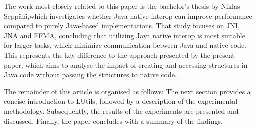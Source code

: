 The work most closely related to this paper is the bachelor’s thesis by Niklas Seppälä\cite{b9},which investigates whether
Java native interop can improve performance compared to purely Java-based implementations.
That study focuses on JNI, JNA and FFMA, concluding that utilizing Java native interop is most suitable for larger tasks,
which minimize communication between Java and native code.
This represents the key difference to the approach presented by the present paper, which aims to analyse the impact of
creating and accessing structures in Java code without passing the structures to native code.

The remainder of this article is organised as follows:
The next section provides a concise introduction to LUtils, followed by a description of the experimental methodology.
Subsequently, the results of the experiments are presented and discussed.
Finally, the paper concludes with a summary of the findings.
